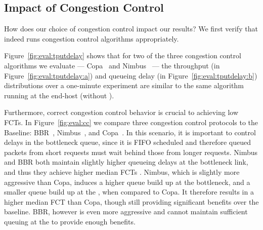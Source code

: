 \subsection{Impact of Congestion Control}\label{s:robust:cross}\label{s:eval:cc}
How does our choice of congestion control impact our results? 
We first verify that \name indeed runs congestion control algorithms appropriately.

Figure~\ref{fig:eval:tputdelay} shows that for two of the three congestion control algorithms we evaluate --- Copa~\cite{copa} and Nimbus~\cite{nimbus} --- the throughput (in Figure~\ref{fig:eval:tputdelay:a}) and queueing delay (in Figure~\ref{fig:eval:tputdelay:b}) distributions over a one-minute experiment are similar to the same algorithm running at the end-host (\ie without \name).


Furthermore, correct congestion control behavior is crucial to achieving low FCTs.
In Figure~\ref{fig:eval:cc} we compare three congestion control protocols to the Baseline: BBR~\cite{bbr}, Nimbus~\cite{nimbus}, and Copa~\cite{copa}.
In this scenario, it is important to control delays in the bottleneck queue, since it is FIFO scheduled and therefore queued packets from short requests must wait behind those from longer requests. Nimbus and BBR both maintain slightly higher queueing delays at the bottleneck link, and thus they achieve higher median FCTs . 
Nimbus, which is slightly more aggressive than Copa, induces a higher queue build up at the bottleneck, and a smaller queue build up at the \name, when compared to Copa. It therefore results in a higher median FCT than Copa, though still providing significant benefits over the baseline. 
BBR, however is even more aggressive and cannot maintain sufficient queuing at the \name to provide enough benefits.




